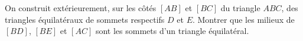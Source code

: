 On construit extérieurement, sur les côtés $[AB]$ et $[BC]$ du triangle $ABC$, des triangles équilatéraux de sommets respectifs $D$ et $E$. Montrer que les milieux de $[BD]$, $[BE]$ et $[AC]$ sont les sommets d'un triangle équilatéral.
